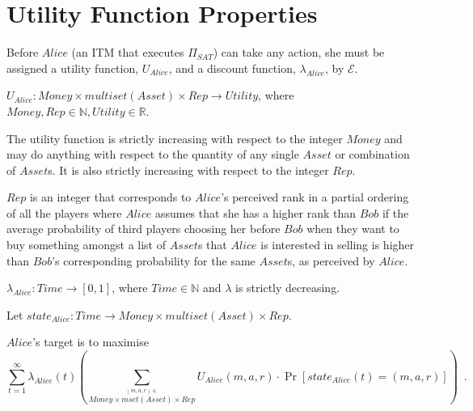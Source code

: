 \section{Utility Function Properties}
  Before $Alice$ (an ITM that executes $\Pi_{SAT}$) can take any action, she must be
  assigned a utility function, $U_{Alice}$, and a discount function, $\lambda_{Alice}$, by
  $\mathcal{E}$.
  \begin{definition}
    $U_{Alice} : Money \times multiset\left(Asset\right) \times Rep \rightarrow
    Utility$, where $Money, Rep \in \mathbb{N}, Utility \in \mathbb{R}$.
  \end{definition}
  The utility function is strictly increasing with respect to the integer $Money$ and may
  do anything with respect to the quantity of any single $Asset$ or combination of
  $Asset$s. It is also strictly increasing with respect to the integer $Rep$.

  $Rep$ is an integer that corresponds to $Alice$'s perceived rank in a partial ordering
  of all the players where $Alice$ assumes that she has a higher rank than $Bob$ if the
  average probability of third players choosing her before $Bob$ when they want to buy
  something amongst a list of $Asset$s that $Alice$ is interested in selling is higher
  than $Bob$'s corresponding probability for the same $Asset$s, as perceived by $Alice$.

  \begin{definition}
    $\lambda_{Alice} : Time \rightarrow \left[0, 1\right]$, where $Time \in \mathbb{N}$
    and $\lambda$ is strictly decreasing.
  \end{definition}
  \begin{definition}[State]
  Let $state_{Alice} : Time \rightarrow Money \times multiset\left(Asset\right) \times
  Rep$.
  \end{definition}
  $Alice$'s target is to maximise
  \begin{equation*}
    \sum\limits_{t = 1}^{\infty}
    \lambda_{Alice}\left(t\right)\left(\sum\limits_{\overset{\left(m, a, r\right)
    \in}{Money \times mset\left(Asset\right) \times Rep}} U_{Alice}\left(m, a,
    r\right) \cdot \Pr\left[state_{Alice}\left(t\right) = \left(m, a,
    r\right)\right]\right) \enspace.
  \end{equation*}
